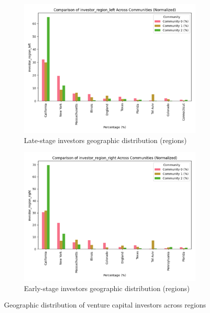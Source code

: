 \begin{figure}[htp]
\centering
\begin{subfigure}{0.8\textwidth}
    \centering
    \includegraphics[width=1\textwidth]{./assets/investor-left-regions.png}
    \caption{Late-stage investors geographic distribution (regions)}
    \label{fig:late_stage_geo}
\end{subfigure}

\vspace{0.5em}

\begin{subfigure}{0.8\textwidth}
    \centering
    \includegraphics[width=1\textwidth]{./assets/investor-right-regions.png}
    \caption{Early-stage investors geographic distribution (regions)}
    \label{fig:early_stage_geo}
\end{subfigure}
\caption{Geographic distribution of venture capital investors across regions}
\label{fig:geographic_distribution}
\end{figure}

